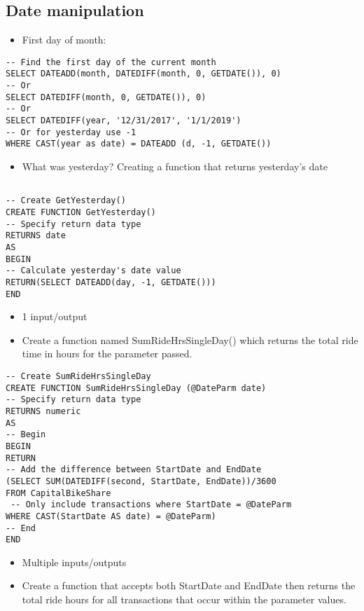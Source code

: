 \documentclass[]{book}
\providecommand{\tightlist}{%
  \setlength{\itemsep}{0pt}\setlength{\parskip}{0pt}}
\begin{document}
\hypertarget{date-manipulation}{%
\subsection{Date manipulation}\label{date-manipulation}}

\begin{itemize}
\tightlist
\item
  First day of month:
\end{itemize}

\begin{verbatim}
-- Find the first day of the current month
SELECT DATEADD(month, DATEDIFF(month, 0, GETDATE()), 0)
-- Or
SELECT DATEDIFF(month, 0, GETDATE()), 0)
-- Or
SELECT DATEDIFF(year, '12/31/2017', '1/1/2019')
-- Or for yesterday use -1
WHERE CAST(year as date) = DATEADD (d, -1, GETDATE())
\end{verbatim}

\begin{itemize}
\tightlist
\item
  What was yesterday? Creating a function that returns yesterday's date
\end{itemize}

\begin{verbatim}

-- Create GetYesterday()
CREATE FUNCTION GetYesterday()
-- Specify return data type
RETURNS date
AS
BEGIN
-- Calculate yesterday's date value
RETURN(SELECT DATEADD(day, -1, GETDATE()))
END 
\end{verbatim}

\begin{itemize}
\tightlist
\item
  1 input/output
\item
  Create a function named SumRideHrsSingleDay() which returns the total ride time in hours for the \citet{DateParm} parameter passed.
\end{itemize}

\begin{verbatim}
-- Create SumRideHrsSingleDay
CREATE FUNCTION SumRideHrsSingleDay (@DateParm date)
-- Specify return data type
RETURNS numeric
AS
-- Begin
BEGIN
RETURN
-- Add the difference between StartDate and EndDate
(SELECT SUM(DATEDIFF(second, StartDate, EndDate))/3600
FROM CapitalBikeShare
 -- Only include transactions where StartDate = @DateParm
WHERE CAST(StartDate AS date) = @DateParm)
-- End
END
\end{verbatim}

\begin{itemize}
\tightlist
\item
  Multiple inputs/outputs
\item
  Create a function that accepts both StartDate and EndDate then returns the total ride hours for all transactions that occur within the parameter values.
\end{itemize}
\end{document}
